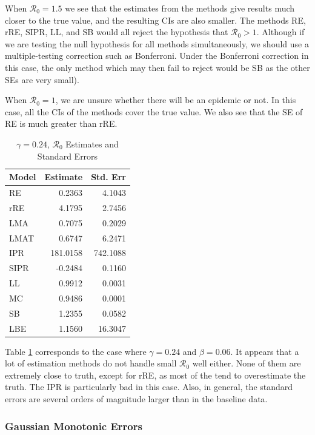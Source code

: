 \documentclass[12pt]{article}
\newcommand{\rr}{\ensuremath{\mathcal{R}_0}}
\begin{document}
When $\rr=1.5$ we see that the estimates from the methods give results much closer to the true value, and the resulting CIs are also smaller.  The methods RE, rRE, SIPR, LL, and SB would all reject the hypothesis that $\rr > 1$.  Although if we are testing the null hypothesis for  all methods simultaneously, we should use a multiple-testing correction such as Bonferroni.  Under the Bonferroni correction in this case, the only method which may then fail to reject would be SB as the other SEs are very small).

When $\rr=1$, we are unsure whether there will be an epidemic or not.  In this case, all the CIs of the methods cover the true value.  We also see that the SE of RE is much greater than rRE.

\begin{table}[H]

	\centering
	\begin{tabular}[t]{l|r|r}
		\hline
		Model & Estimate & Std. Err\\
		\hline
		RE & 0.2363 & 4.1043 \\
		\hline
		rRE & 4.1795 & 2.7456\\
		\hline
		LMA &  0.7075 & 0.2029 \\
		\hline
		LMAT & 0.6747 & 6.2471 \\
		\hline
		IPR & 181.0158 & 742.1088 \\
		\hline
		SIPR & -0.2484 & 0.1160 \\
		\hline
		LL & 0.9912 & 0.0031\\
		\hline
		MC & 0.9486 & 0.0001\\
		\hline
		SB & 1.2355 & 0.0582\\
		\hline
		LBE & 1.1560 & 16.3047\\
		\hline
	\end{tabular}
        \caption{$\gamma = 0.24$, $\rr$ Estimates and Standard Errors}\label{tab:infrec4-res}
\end{table}

Table \ref{tab:infrec4-res} corresponds to the case where $\gamma = 0.24$ and $\beta=0.06$. It appears that a lot of estimation methods do not handle small $\rr$ well either. None of them are extremely close to truth, except for rRE, as most of the tend to overestimate the truth. The IPR is particularly bad in this case. Also, in general, the standard errors are several orders of magnitude larger than in the baseline data.

\subsubsection{Gaussian Monotonic Errors}
\end{document}
